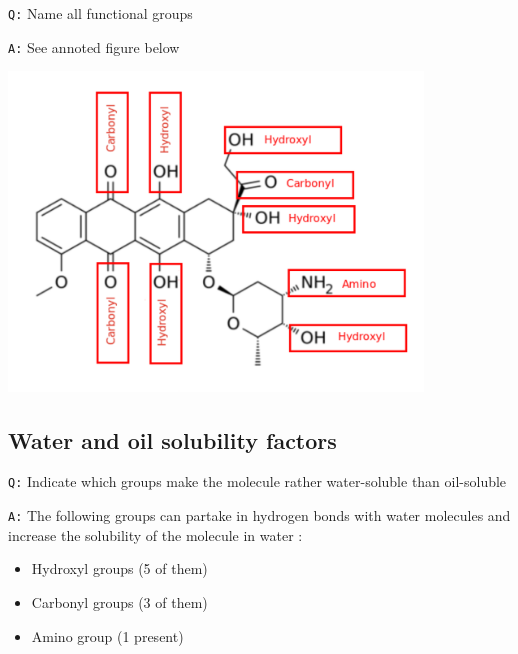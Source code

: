\documentclass[11pt, a4paper,titlepage]{article}
\begin{document}
\texttt{Q:} Name all functional groups

\texttt{A:} See annoted figure below

\includegraphics[width=11cm]{./Figures/Part3MoleculeFunctionalGroups.pdf}
\subsection{Water and oil solubility factors}
\label{sec-3-2}

\texttt{Q:} Indicate which groups make the molecule rather water-soluble
than oil-soluble

\texttt{A:} The following groups can partake in hydrogen bonds with water
molecules and increase the solubility of the molecule in water :

\begin{itemize}
\item Hydroxyl groups (5 of them)
\item Carbonyl groups (3 of them)
\item Amino group (1 present)
\end{itemize}




\end{document}
